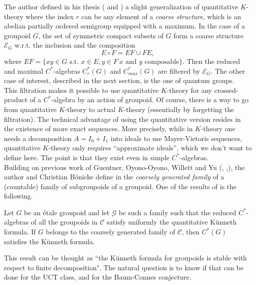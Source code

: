 The author defined in his thesis (\cite{DellAieraThesis} and \cite{dell2018controlled}) a slight generalization of quantitative $K$-theory where the index $r$ can be any element of a \textit{coarse structure}, which is an abelian partially ordered semigroup equipped with a maximum. In the case of a groupoid $G$, the set of symmetric compact subsets of $G$ form a coarse structure $\mathcal E_G$ w.r.t. the inclusion and the composition
\[E \circ F = EF \cup FE,\]
where $EF = \{ xy \in G \text{ s.t. } x\in E, y\in F \ x\text{ and } y \text{ composable} \}$. Then the reduced and maximal $C^*$-algebras $C^*_r(G)$ and $C^*_{max}(G)$ are filtered by $\mathcal E_G$. The other case of interest, described in the next section, is the one of quantum groups.\\

This filtration makes it possible to use quantitative $K$-theory for any crossed-product of a $C^*$-algebra by an action of groupoid. Of course, there is a way to go from quantitative $K$-theory to actual $K$-theory (essentially by forgetting the filtration). The technical advantage of using the quantitative version resides in the existence of more exact sequences. More precisely, while in $K$-theory one needs a decomposition $A= I_0+I_1$ into ideals to use Mayer-Vietoris sequences, quantitative $K$-theory only requires ``approximate ideals'', which we don't want to define here. The point is that they exist even in simple $C^*$-algebras. \\

Building on previous work of Guentner, Oyono-Oyono, Willett and Yu (\cite{OY4}, \cite{GWY},\cite{GWY2}), the author and Christian B\"onicke define in \cite{DelBo18} the \textit{coarsely generated family} of a (countable) family of subgroupoids of a groupoid. One of the results of \cite{DelBo18} is the following.

\begin{theorem} Let $G$ be an \'etale groupoid and let $\mathcal G$ be such a family such that the reduced $C^*$-algebras of all the groupoids in $\mathcal C$ satisfy uniformly the quantitative K\"unneth formula. If $G$ belongs to the coarsely generated family of $\mathcal C$, then $C^*(G)$ satisfies the K\"unneth formula.         
\end{theorem}

This result can be thought as ``the K\"unneth formula for groupoids is stable with respect to finite decomposition". The natural question is to know if that can be done for the UCT class, and for the Baum-Connes conjecture.

